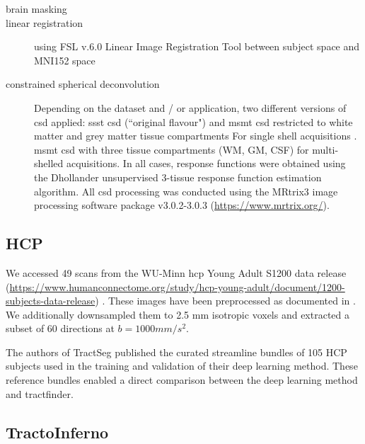 \begin{description}
  \item[brain masking\autocite{Tournier2019}]
  \item[linear registration] using FSL v.6.0 Linear Image Registration Tool\autocite{Jenkinson2001,Jenkinson2002} between subject space and MNI152\autocite{Fonov2011} space
  \item[constrained spherical deconvolution] Depending on the dataset and / or application, two different versions of \gls{csd} applied: \gls{ssst} \gls{csd} (``original flavour")\autocite{Tournier2007,Tournier2019} and \gls{msmt} \gls{csd}\autocite{Jeurissen2014} restricted to white matter and grey matter tissue compartments For single shell acquisitions . \gls{msmt} \gls{csd} with three tissue compartments (WM, GM, CSF) for multi-shelled acquisitions. In all cases, response functions were obtained using the Dhollander unsupervised 3-tissue response function estimation algorithm.\autocite{Dhollander2016,Dhollander2019}
  All \gls{csd} processing was conducted using the MRtrix3 image processing software package v3.0.2-3.0.3 (\url{https://www.mrtrix.org/}).\autocite{Tournier2019}
\end{description}


\subsection{HCP}

We accessed 49 scans from the WU-Minn \gls{hcp} Young Adult S1200 data release (\url{https://www.humanconnectome.org/study/hcp-young-adult/document/1200-subjects-data-release}) \autocite{VanEssen2013}.
These images have been preprocessed as documented in \textcite{Glasser2013}.
We additionally downsampled them to 2.5 mm isotropic voxels and extracted a subset of 60 directions at $b=1000 mm/s^2$.

The authors of TractSeg\autocite{Wasserthal2018} published the curated streamline bundles of 105 HCP subjects used in the training and validation of their deep learning method.
These reference bundles enabled a direct comparison between the deep learning method and tractfinder.

\subsection{TractoInferno}

